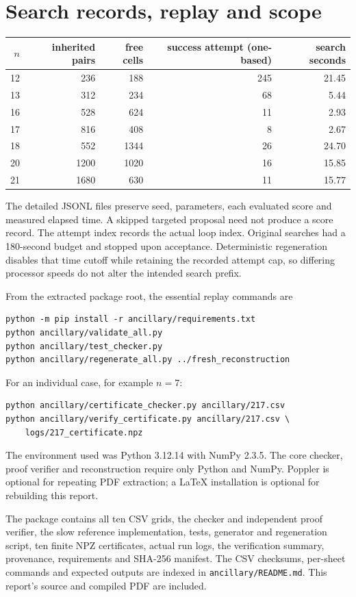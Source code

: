 \documentclass[11pt]{article}
\begin{document}
\section{Search records, replay and scope}
\begingroup\small
\begin{center}
\begin{tabular}{rrrrr}
\toprule
$n$ & inherited pairs & free cells & success attempt (one-based) & search seconds\\
\midrule
12 & 236 & 188 & 245 & 21.45 \\
13 & 312 & 234 & 68 & 5.44 \\
16 & 528 & 624 & 11 & 2.93 \\
17 & 816 & 408 & 8 & 2.67 \\
18 & 552 & 1344 & 26 & 24.70 \\
20 & 1200 & 1020 & 16 & 15.85 \\
21 & 1680 & 630 & 11 & 15.77 \\
\bottomrule
\end{tabular}
\end{center}
The detailed JSONL files preserve seed, parameters, each evaluated score
and measured elapsed time. A skipped targeted proposal need not produce a
score record. The attempt index records the actual loop index. Original
searches had a 180-second budget and stopped upon acceptance. Deterministic
regeneration disables that time cutoff while retaining the recorded attempt
cap, so differing processor speeds do not alter the intended search prefix.

From the extracted package root, the essential replay commands are
\begin{verbatim}
python -m pip install -r ancillary/requirements.txt
python ancillary/validate_all.py
python ancillary/test_checker.py
python ancillary/regenerate_all.py ../fresh_reconstruction
\end{verbatim}
For an individual case, for example $n=7$:
\begin{verbatim}
python ancillary/certificate_checker.py ancillary/217.csv
python ancillary/verify_certificate.py ancillary/217.csv \
    logs/217_certificate.npz
\end{verbatim}
The environment used was Python 3.12.14 with NumPy 2.3.5. The core
checker, proof verifier and reconstruction require only Python and NumPy.
Poppler is optional for repeating PDF extraction; a LaTeX installation is
optional for rebuilding this report.

The package contains all ten CSV grids, the checker and independent proof
verifier, the slow reference implementation, tests, generator and regeneration
script, ten finite NPZ certificates, actual run logs, the verification
summary, provenance, requirements and SHA-256 manifest. The CSV checksums,
per-sheet commands and expected outputs are indexed in
\texttt{ancillary/README.md}. This report's source and compiled PDF are included.
\end{document}
